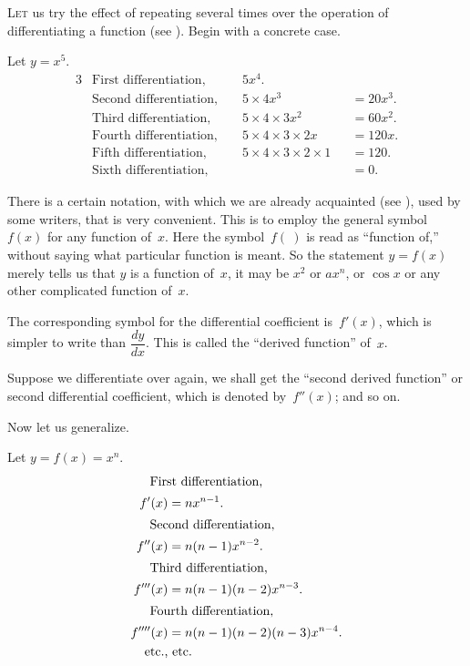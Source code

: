 \documentclass[12pt]{book}[2005/09/16]
\newcommand{\DPPageSep}[2]{\Pagelabel{#2}}
\newcommand{\Pagelabel}[1]
  {\phantomsection\label{#1}}
\newcommand{\Pageref}[2][p.]{%
  \ifthenelse{\not\equal{#1}{}}{%
    \hyperref[#2]{#1~\pageref{#2}}%
  }{%
    \hyperref[#2]{\pageref{#2}}%
  }%
}
\newcommand{\First}[1]{\noindent\textsc{#1}}
\begin{document}
\First{Let} us try the effect of repeating several times over
the operation of differentiating a function (see \Pageref{function}).
Begin with a concrete case.

Let $y = x^5$.
\begin{alignat*}{3}
&\text{First differentiation, }  &&5x^4.              &&         \\
&\text{Second differentiation, } &&5 × 4x^3           &&= 20x^3. \\
&\text{Third differentiation, }  &&5 × 4 × 3x^2       &&= 60x^2. \\
&\text{Fourth differentiation, } &&5 × 4 × 3 × 2x     &&= 120x.  \\
&\text{Fifth differentiation, }  &&5 × 4 × 3 × 2 × 1  &&= 120.   \\
&\text{Sixth differentiation, }  &&                   &&= 0.
\end{alignat*}

There is a certain notation, with which we are
already acquainted (see \Pageref{notation}), used by some writers,
that is very convenient. This is to employ the
general symbol~$f(x)$ for any function of~$x$. Here
the symbol~$f(~)$ is read as ``function of,'' without
saying what particular function is meant. So the
statement $y=f(x)$ merely tells us that $y$ is a function
of~$x$, it may be $x^2$ or $ax^n$, or $\cos x$ or any other complicated
function of~$x$.

The corresponding symbol for the differential coefficient
is~$f'(x)$, which is simpler to write than $\dfrac{dy}{dx}$.
This is called the ``derived function'' of~$x$.
\DPPageSep{062.png}{50}%

Suppose we differentiate over again, we shall get
the ``second derived function'' or second differential
coefficient, which is denoted by~$f''(x)$; and so on.

Now let us generalize.

Let $y = f(x) = x^n$.
\begin{align*}[m]
\intertext{\indent First differentiation,}     f'(x) &= nx^{n-1}. \\
\intertext{\indent Second differentiation,}   f''(x) &= n(n-1)x^{n-2}. \\
\intertext{\indent Third differentiation,}   f'''(x) &= n(n-1)(n-2)x^{n-3}. \\
\intertext{\indent Fourth differentiation,} f''''(x) &= n(n-1)(n-2)(n-3)x^{n-4}. \\
    &\llap{\text{etc.,}} \text{ etc.}
\end{align*}
\end{document}
